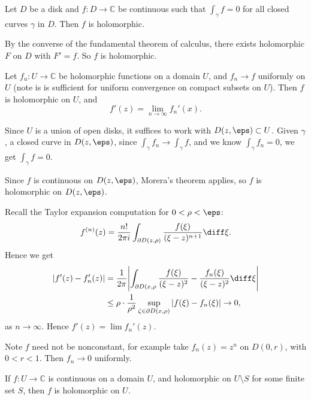 \documentclass[12pt]{article}
\begin{document}
\begin{corollary}
	Let $D$ be a disk and $f : D \to \mathbb{C}$ be continuous such that $\int_{\gamma} f = 0$ for all closed curves $\gamma$ in $D$. Then $f$ is holomorphic.
\end{corollary}

\begin{proofbox}
	By the converse of the fundamental theorem of calculus, there exists holomorphic $F$ on $D$ with $F' = f$. So $f$ is holomorphic.
\end{proofbox}

\begin{corollary}
	Let $f_u : U \to \mathbb{C}$ be holomorphic functions on a domain $U$, and $f_n \to f$ uniformly on $U$ (note is is sufficient for uniform convergence on compact subsets on $U$). Then $f$ is holomorphic on $U$, and
	\[
	f'(z) = \lim_{n \to \infty} f_n'(x)
	.\]
\end{corollary}

\begin{proofbox}
	Since $U$ is a union of open disks, it suffices to work with $D(z, \eps) \subset U$. Given $\gamma$, a closed curve in $D(z, \eps)$, since $\int_{\gamma}f_n \to \int_{\gamma}f$, and we know $\int_{\gamma} f_n = 0$, we get $\int_{\gamma} f = 0$.

	Since $f$ is continuous on $D(z, \eps)$, Morera's theorem applies, so $f$ is holomorphic on $D(z, \eps)$.

	Recall the Taylor expansion computation for $0 < \rho < \eps$:
	\[
	f^{(n)}(z) = \frac{n!}{2 \pi i} \int_{\partial D(z, \rho)} \frac{f(\xi)}{(\xi - z)^{n+1}} \diff \xi
	.\]
	Hence we get
	\begin{align*}
		|f'(z) - f_n'(z)| &= \frac{1}{2 \pi} \Biggl| \int_{\partial D(x, \rho} \frac{f(\xi)}{(\xi - z)^2} - \frac{f_n(\xi)}{(\xi - z)^2} \diff \xi \Biggr| \\
				  &\leq \rho \cdot \frac{1}{\rho^2} \sup_{\zeta \in \partial D(x, \rho)} |f(\xi) - f_n(\xi)| \to 0,
	\end{align*}
	as $n \to \infty$. Hence $f'(z) = \lim f_n'(z)$.
\end{proofbox}

\begin{remark}
	Note $f$ need not be nonconstant, for example take $f_n(z) = z^{n}$ on $D(0, r)$, with $0 < r < 1$. Then $f_n \to 0$ uniformly.
\end{remark}

\begin{corollary}
	If $f : U \to \mathbb{C}$ is continuous on a domain $U$, and holomorphic on $U \setminus S$ for some finite set $S$, then $f$ is holomorphic on $U$.
\end{corollary}
\end{document}
